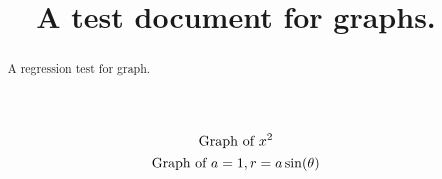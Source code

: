 \documentclass{ximera}
\title{A test document for graphs.}
\begin{document}
\begin{abstract}
  A regression test for graph.
\end{abstract}
\maketitle
\[
\graph{x^2}
\]
\[
\graph[xmin=-2.5,xmax=2.5,ymin=-.5,ymax=1.5,polar]{a=1,r=a \sin(\theta)}
\]
\end{document}
